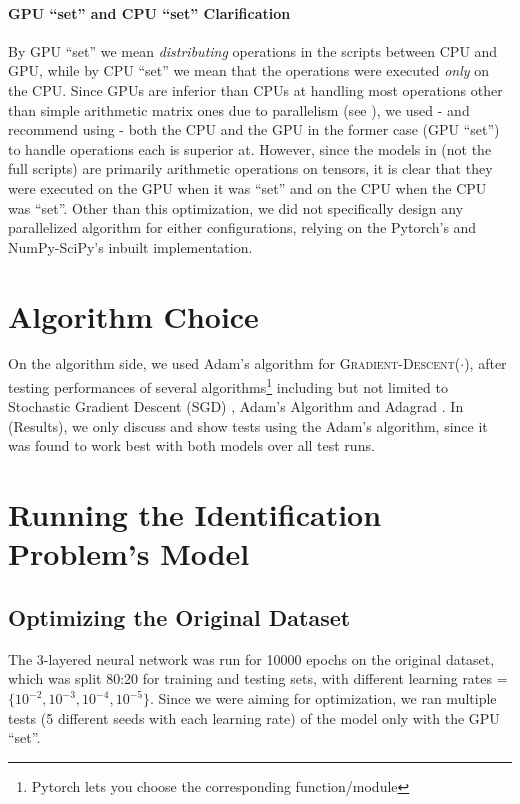 \paragraph{GPU ``set'' and CPU ``set'' Clarification}  By GPU ``set'' we mean \textit{distributing} operations in the scripts between CPU and GPU, while by CPU ``set'' we mean that the operations were executed \textit{only} on the CPU. Since GPUs are inferior than CPUs at handling most operations other than simple arithmetic matrix ones due to parallelism (see ), we used - and recommend using - both the CPU and the GPU in the former case (GPU ``set'') to handle operations each is superior at. However, since the models in  (not the full scripts) are primarily arithmetic operations on  tensors, it is clear that they were executed on the GPU when it was ``set'' and on the CPU when the CPU was ``set''. Other than this optimization, we did not specifically design any parallelized algorithm for either configurations, relying on the Pytorch's and NumPy-SciPy's inbuilt implementation.

\section{Algorithm Choice} \label{sec:Algorithm Choice}
On the algorithm side, we used Adam's algorithm for \textsc{Gradient-Descent}($\cdot$), after testing performances of several algorithms\footnote{Pytorch lets you choose the corresponding function/module} including but not limited to Stochastic Gradient Descent (SGD) \cite{SGD}, Adam's Algorithm \cite{Adam} and Adagrad \cite{Adagrad}. In  (Results), we only discuss and show tests using the Adam's algorithm, since it was found to work best with both models over all test runs.

\section{Running the Identification Problem's Model} \label{sec:Running the Identification Problem's Model}
\subsection{Optimizing the Original Dataset} \label{sec:Identification Problem-Optimizing the Original Dataset}
The 3-layered neural network was run for 10000 epochs on the original dataset, which was split 80:20 for training and testing sets, with different learning rates = $\{10^{-2}, 10^{-3}, 10^{-4}, 10^{-5}\}$. Since we were aiming for optimization, we ran multiple tests (5 different seeds with each learning rate) of the model only with the GPU ``set''.

